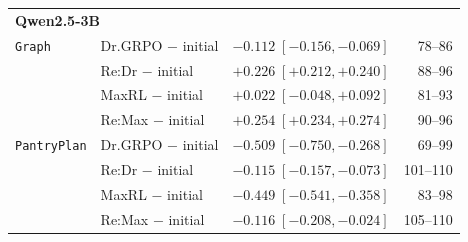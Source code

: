 \begin{table}[t]
\begin{tabular}{llrr}
\midrule
\multicolumn{4}{l}{\textbf{Qwen2.5-3B}} \\
\texttt{Graph} & Dr.GRPO $-$ initial & $-0.112\;[-0.156, -0.069]$ & 78--86 \\
 & Re:Dr $-$ initial & $+0.226\;[+0.212, +0.240]$ & 88--96 \\
 & MaxRL $-$ initial & $+0.022\;[-0.048, +0.092]$ & 81--93 \\
 & Re:Max $-$ initial & $+0.254\;[+0.234, +0.274]$ & 90--96 \\
\texttt{PantryPlan} & Dr.GRPO $-$ initial & $-0.509\;[-0.750, -0.268]$ & 69--99 \\
 & Re:Dr $-$ initial & $-0.115\;[-0.157, -0.073]$ & 101--110 \\
 & MaxRL $-$ initial & $-0.449\;[-0.541, -0.358]$ & 83--98 \\
 & Re:Max $-$ initial & $-0.116\;[-0.208, -0.024]$ & 105--110 \\
\bottomrule
\end{tabular}
\end{table}
